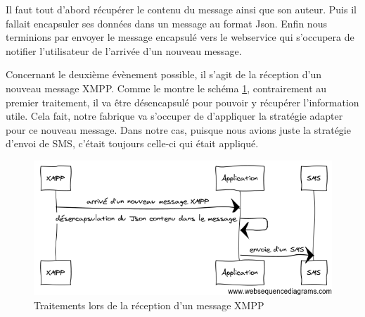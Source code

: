 Il faut tout d'abord récupérer le contenu du message ainsi que son auteur. Puis il fallait encapsuler 
ses données dans un message au format Json. Enfin nous terminions par envoyer le message encapsulé vers 
le webservice qui s'occupera de notifier l'utilisateur de l'arrivée d'un nouveau message.

Concernant le deuxième évènement possible, il s'agit de la réception d'un nouveau message XMPP. Comme le
montre le schéma \ref{desencapsulation}, contrairement au premier traitement, il va être désencapsulé pour 
pouvoir y récupérer l'information utile. Cela fait, notre fabrique va s'occuper de d'appliquer la stratégie 
adapter pour ce nouveau message. Dans notre cas, puisque nous avions juste la stratégie d'envoi de SMS, c'était toujours celle-ci qui était appliqué.


\begin{figure}[!h]
	\center
	\includegraphics[width=12cm]{img/desencapsulation.png}
	\caption{Traitements lors de la réception d'un message XMPP}
	\label{desencapsulation}
\end{figure}
